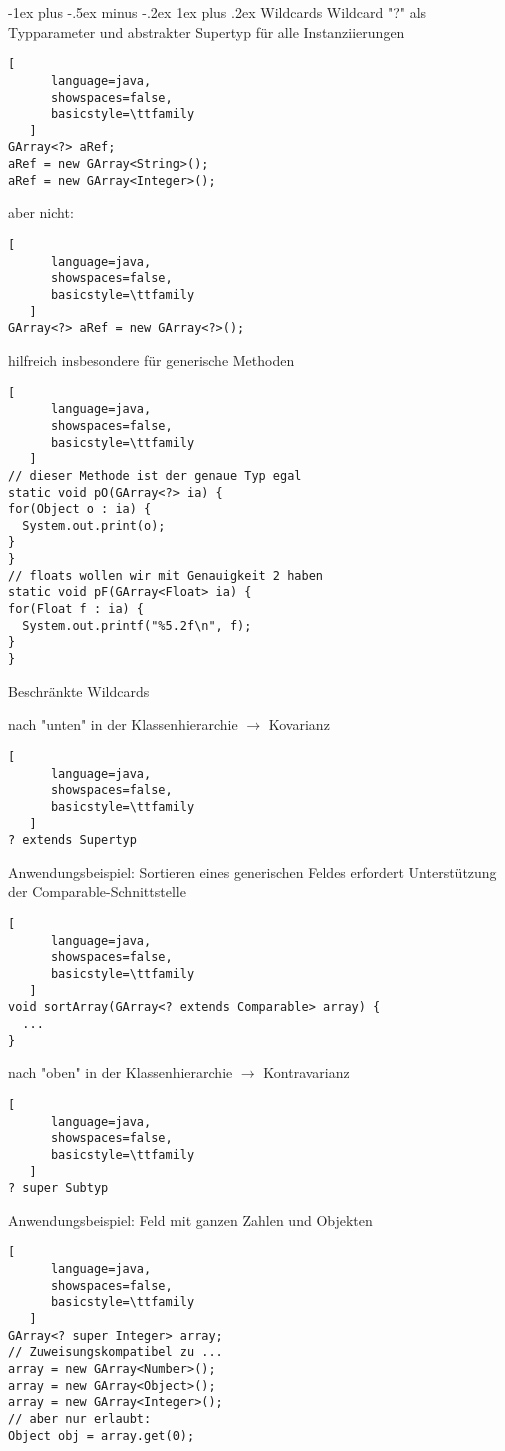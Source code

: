 \documentclass[10pt]{article}
\makeatletter
\renewcommand{\subsubsection}{\@startsection{subsubsection}{3}{0mm}%
                                {-1ex plus -.5ex minus -.2ex}%
                                {1ex plus .2ex}%
                                {\normalfont\small\bfseries}}
\makeatother
\begin{document}
\subsubsection{Wildcards}
Wildcard "?" als Typparameter und abstrakter Supertyp für alle Instanziierungen
\begin{lstlisting}[
      language=java,
      showspaces=false,
      basicstyle=\ttfamily
   ]
GArray<?> aRef;
aRef = new GArray<String>();
aRef = new GArray<Integer>();
\end{lstlisting}

aber nicht:
\begin{lstlisting}[
      language=java,
      showspaces=false,
      basicstyle=\ttfamily
   ]
GArray<?> aRef = new GArray<?>();
\end{lstlisting}

hilfreich insbesondere für generische Methoden
\begin{lstlisting}[
      language=java,
      showspaces=false,
      basicstyle=\ttfamily
   ]
// dieser Methode ist der genaue Typ egal
static void pO(GArray<?> ia) {
for(Object o : ia) {
  System.out.print(o);
}
}
// floats wollen wir mit Genauigkeit 2 haben
static void pF(GArray<Float> ia) {
for(Float f : ia) {
  System.out.printf("%5.2f\n", f);
}
}
\end{lstlisting}


Beschränkte Wildcards 
\begin{itemize*}
  \item nach "unten" in der Klassenhierarchie $\rightarrow$ Kovarianz
  \begin{lstlisting}[
      language=java,
      showspaces=false,
      basicstyle=\ttfamily
   ] 
? extends Supertyp 
\end{lstlisting}
  
  Anwendungsbeispiel: Sortieren eines generischen Feldes erfordert Unterstützung der Comparable-Schnittstelle
  \begin{lstlisting}[
      language=java,
      showspaces=false,
      basicstyle=\ttfamily
   ]
void sortArray(GArray<? extends Comparable> array) {
  ...
}
\end{lstlisting}
  
  \item nach "oben" in der Klassenhierarchie $\rightarrow$ Kontravarianz
  \begin{lstlisting}[
      language=java,
      showspaces=false,
      basicstyle=\ttfamily
   ]
? super Subtyp
\end{lstlisting}
  
  Anwendungsbeispiel: Feld mit ganzen Zahlen und Objekten
  \begin{lstlisting}[
      language=java,
      showspaces=false,
      basicstyle=\ttfamily
   ]
GArray<? super Integer> array;
// Zuweisungskompatibel zu ...
array = new GArray<Number>();
array = new GArray<Object>();
array = new GArray<Integer>();
// aber nur erlaubt:
Object obj = array.get(0);
\end{lstlisting}
  
\end{itemize*}
\end{document}
